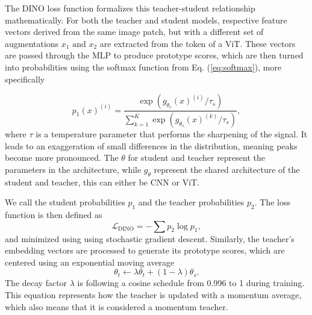 %
The DINO loss function formalizes this teacher-student relationship mathematically. For both the teacher and student models, respective feature vectors derived from the same image patch, but with a different set of augmentations $x_1 \text{ and } x_2$ are extracted from the token of a ViT. These vectors are passed through the MLP to produce prototype scores, which are then turned into probabilities using the softmax function from Eq. (\ref{eq:softmax}), more specifically

\begin{equation} \label{eq:dino-softmax}
p_1(x)^{(i)} = \frac{\exp\left(g_{\theta_s}(x)^{(i)} / \tau_s\right)}{\sum_{k=1}^K \exp\left(g_{\theta_s}(x)^{(k)} / \tau_s\right)},
\end{equation}
where $\tau$ is a temperature parameter that performs the sharpening of the signal. It leads to an exaggeration of small differences in the distribution, meaning peaks become more pronounced. The $\theta$ for student and teacher represent the parameters in the architecture, while $g_\theta$ represent the shared architecture of the student and teacher, this can either be CNN or ViT.

We call the student probabilities \( p_1 \) and the teacher probabilities \( p_2 \). The loss function is then defined as
\[
\mathcal{L}_{\text{DINO}} = -\sum p_2 \log p_1,
\]
and minimized using using stochastic gradient descent. Similarly, the teacher’s embedding vectors are processed to generate its prototype scores, which are centered using an exponential moving average 
\begin{equation} \label{eq:ema}
\theta_t \gets \lambda \theta_t + (1 - \lambda) \theta_s. 
\end{equation}
%
The decay factor $\lambda$ is following a cosine schedule from 0.996 to 1 during training. This equation represents how the teacher is updated with a momentum average, which also means that it is considered a momentum teacher.


